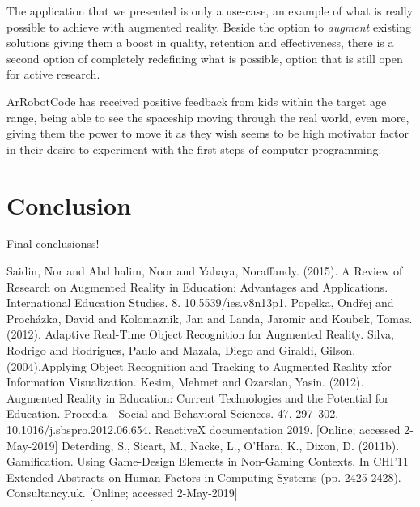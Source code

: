 \documentclass[12 pct]{report}
\begin{document}
The application that we presented is only a use-case, an example of what is really possible to achieve with augmented reality. Beside the option to \textit{augment} existing solutions giving them a boost in quality, retention and effectiveness, there is a second option of completely redefining what is possible, option that is still open for active research.

ArRobotCode has received positive feedback from kids within the target age range, being able to see the spaceship moving through the real world, even more, giving them the power to move it as they wish seems to be high motivator factor in their desire to experiment with the first steps of computer programming.


\chapter{Conclusion}
Final conclusionss!




\begin{thebibliography}{3}
Saidin, Nor and Abd halim, Noor and Yahaya, Noraffandy. (2015). A Review of Research on Augmented Reality in Education: Advantages and Applications. International Education Studies. 8. 10.5539/ies.v8n13p1. 
Popelka, Ondřej and Procházka, David and Kolomaznik, Jan and Landa, Jaromir and Koubek, Tomas. (2012). Adaptive Real-Time Object Recognition for Augmented Reality. 
Silva, Rodrigo and Rodrigues, Paulo and Mazala, Diego and Giraldi, Gilson. (2004).Applying Object Recognition and Tracking to Augmented Reality xfor Information Visualization. 
Kesim, Mehmet and Ozarslan, Yasin. (2012). Augmented Reality in Education: Current Technologies and the Potential for Education. Procedia - Social and Behavioral Sciences. 47. 297–302. 10.1016/j.sbspro.2012.06.654. 
ReactiveX documentation 2019. [Online; accessed 2-May-2019]
Deterding, S., Sicart, M., Nacke, L., O'Hara, K., Dixon, D. (2011b). Gamification. Using Game-Design Elements in Non-Gaming Contexts. In CHI'11 Extended Abstracts on Human Factors in Computing Systems (pp. 2425-2428).
 Consultancy.uk. [Online; accessed 2-May-2019]
\end{thebibliography}
\end{document}
